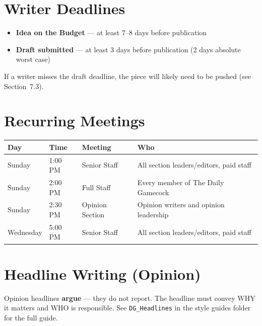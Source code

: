 \documentclass[12pt]{article}
\newlength{\tblwidth}
\begin{document}
\section{Writer Deadlines}

\begin{itemize}
    \item \textbf{Idea on the Budget} --- at least 7--8 days before publication
    \item \textbf{Draft submitted} --- at least 3 days before publication (2 days absolute worst case)
\end{itemize}

If a writer misses the draft deadline, the piece will likely need to be pushed (see Section~7.3).

\section{Recurring Meetings}

\begin{longtable}{p{0.15\tblwidth} p{0.13\tblwidth} p{0.25\tblwidth} p{0.43\tblwidth}}
\toprule
\textbf{Day} & \textbf{Time} & \textbf{Meeting} & \textbf{Who} \\
\midrule
Sunday & 1:00 PM & Senior Staff & All section leaders/editors, paid staff \\
Sunday & 2:00 PM & Full Staff & Every member of The Daily Gamecock \\
Sunday & 2:30 PM & Opinion Section & Opinion writers and opinion leadership \\
Wednesday & 5:00 PM & Senior Staff & All section leaders/editors, paid staff \\
\bottomrule
\end{longtable}

\newpage
\section{Headline Writing (Opinion)}

Opinion headlines \textbf{argue} --- they do not report. The headline must convey WHY it matters and WHO is responsible. See \texttt{DG\_Headlines} in the style guides folder for the full guide.
\end{document}
